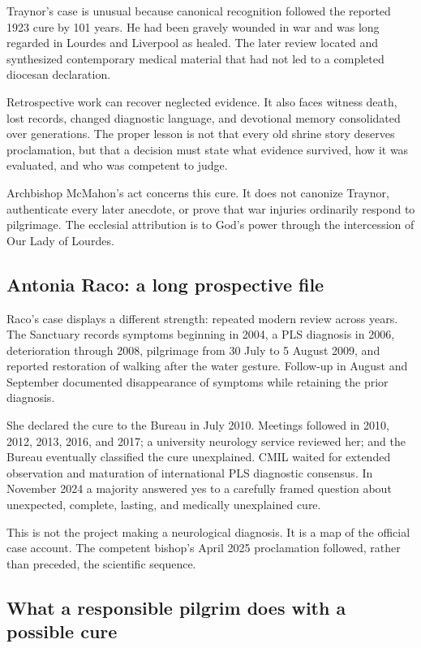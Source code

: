 Traynor's case is unusual because canonical recognition followed the reported 1923 cure by 101 years. He had been gravely wounded in war and was long regarded in Lourdes and Liverpool as healed. The later review located and synthesized contemporary medical material that had not led to a completed diocesan declaration.

Retrospective work can recover neglected evidence. It also faces witness death, lost records, changed diagnostic language, and devotional memory consolidated over generations. The proper lesson is not that every old shrine story deserves proclamation, but that a decision must state what evidence survived, how it was evaluated, and who was competent to judge.

Archbishop McMahon's act concerns this cure. It does not canonize Traynor, authenticate every later anecdote, or prove that war injuries ordinarily respond to pilgrimage. The ecclesial attribution is to God's power through the intercession of Our Lady of Lourdes.

\subsection{Antonia Raco: a long prospective file}

Raco's case displays a different strength: repeated modern review across years. The Sanctuary records symptoms beginning in 2004, a PLS diagnosis in 2006, deterioration through 2008, pilgrimage from 30 July to 5 August 2009, and reported restoration of walking after the water gesture. Follow-up in August and September documented disappearance of symptoms while retaining the prior diagnosis.

She declared the cure to the Bureau in July 2010. Meetings followed in 2010, 2012, 2013, 2016, and 2017; a university neurology service reviewed her; and the Bureau eventually classified the cure unexplained. CMIL waited for extended observation and maturation of international PLS diagnostic consensus. In November 2024 a majority answered yes to a carefully framed question about unexpected, complete, lasting, and medically unexplained cure.

This is not the project making a neurological diagnosis. It is a map of the official case account. The competent bishop's April 2025 proclamation followed, rather than preceded, the scientific sequence.

\subsection{What a responsible pilgrim does with a possible cure}

